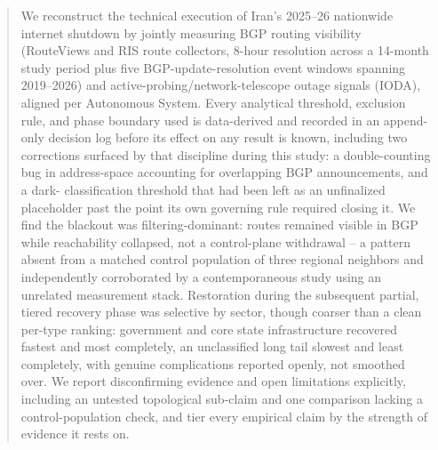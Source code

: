 \begin{abstract}
We reconstruct the technical execution of Iran's 2025--26 nationwide
internet shutdown by jointly measuring BGP routing visibility (RouteViews
and RIS route collectors, 8-hour resolution across a 14-month study period
plus five BGP-update-resolution event windows spanning 2019--2026) and
active-probing/network-telescope outage signals (IODA), aligned per
Autonomous System. Every analytical threshold, exclusion rule, and phase
boundary used is data-derived and recorded in an append-only decision log
before its effect on any result is known, including two corrections
surfaced by that discipline during this study: a double-counting bug in
address-space accounting for overlapping BGP announcements, and a dark-
classification threshold that had been left as an unfinalized placeholder
past the point its own governing rule required closing it. We find the
blackout was filtering-dominant: routes remained visible in BGP while
reachability collapsed, not a control-plane withdrawal -- a pattern absent
from a matched control population of three regional neighbors and
independently corroborated by a contemporaneous study using an unrelated
measurement stack. Restoration during the subsequent partial, tiered
recovery phase was selective by sector, though coarser than a clean
per-type ranking: government and core state infrastructure recovered
fastest and most completely, an unclassified long tail slowest and least
completely, with genuine complications reported openly, not smoothed over.
We report disconfirming evidence and open limitations explicitly, including
an untested topological sub-claim and one comparison lacking a
control-population check, and tier every empirical claim by the strength of
evidence it rests on.
\end{abstract}
